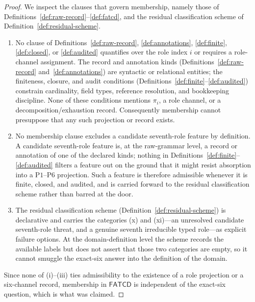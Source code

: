 \documentclass[11pt]{article}
\theoremstyle{definition}
\newcommand{\FATCD}{\ensuremath{\mathsf{FATCD}}}
\newcommand{\Pone}{\ensuremath{\mathrm{P1}}}
\newcommand{\Psix}{\ensuremath{\mathrm{P6}}}
\begin{document}
\begin{proof}
We inspect the clauses that govern membership, namely those of
Definitions~\ref{def:raw-record}--\ref{def:fatcd}, and the residual
classification scheme of Definition~\ref{def:residual-scheme}.
\begin{enumerate}[label=(\roman*),topsep=2pt,itemsep=1pt]
  \item No clause of Definitions~\ref{def:raw-record},
    \ref{def:annotations}, \ref{def:finite}, \ref{def:closed}, or
    \ref{def:audited} quantifies over the role index \(i\) or requires a
    role-channel assignment. The record and annotation kinds
    (Definitions~\ref{def:raw-record} and~\ref{def:annotations}) are
    syntactic or relational entities; the finiteness, closure, and audit
    conditions (Definitions~\ref{def:finite}--\ref{def:audited}) constrain
    cardinality, field types, reference resolution, and bookkeeping
    discipline. None of these conditions mentions \(\pi_i\), a role channel,
    or a decomposition/exhaustion record. Consequently membership cannot
    presuppose that any such projection or record exists.
  \item No membership clause excludes a candidate seventh-role feature by
    definition. A candidate seventh-role feature is, at the raw-grammar
    level, a record or annotation of one of the declared kinds; nothing in
    Definitions~\ref{def:finite}--\ref{def:audited} filters a feature out on
    the ground that it might resist absorption into a
    \Pone{}--\Psix{} projection. Such a feature is therefore admissible
    whenever it is finite, closed, and audited, and is carried forward to
    the residual classification scheme rather than barred at the door.
  \item The residual classification scheme
    (Definition~\ref{def:residual-scheme}) is declarative and carries the
    categories (x) and (xi)---an unresolved candidate seventh-role threat,
    and a genuine seventh irreducible typed role---as explicit failure
    options. At the domain-definition level the scheme records the available
    labels but does not assert that those two categories are empty, so it
    cannot smuggle the exact-six answer into the definition of the domain.
\end{enumerate}
Since none of (i)--(iii) ties admissibility to the existence of a role
projection or a six-channel record, membership in \FATCD{} is independent of
the exact-six question, which is what was claimed.
\end{proof}
\end{document}
